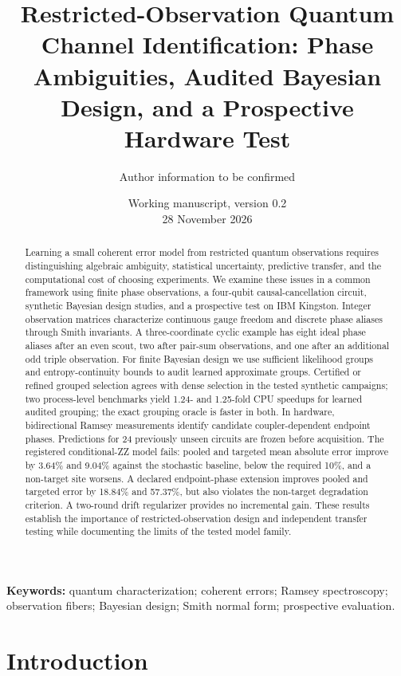 \documentclass[11pt,a4paper]{article}
\title{Restricted-Observation Quantum Channel Identification: Phase Ambiguities, Audited Bayesian Design, and a Prospective Hardware Test}
\author{Author information to be confirmed}
\date{Working manuscript, version 0.2\\28 November 2026}
\begin{document}
\maketitle


\begin{abstract}

Learning a small coherent error model from restricted quantum observations requires distinguishing algebraic ambiguity, statistical uncertainty, predictive transfer, and the computational cost of choosing experiments. We examine these issues in a common framework using finite phase observations, a four-qubit causal-cancellation circuit, synthetic Bayesian design studies, and a prospective test on IBM Kingston. Integer observation matrices characterize continuous gauge freedom and discrete phase aliases through Smith invariants. A three-coordinate cyclic example has eight ideal phase aliases after an even scout, two after pair-sum observations, and one after an additional odd triple observation. For finite Bayesian design we use sufficient likelihood groups and entropy-continuity bounds to audit learned approximate groups. Certified or refined grouped selection agrees with dense selection in the tested synthetic campaigns; two process-level benchmarks yield 1.24- and 1.25-fold CPU speedups for learned audited grouping; the exact grouping oracle is faster in both. In hardware, bidirectional Ramsey measurements identify candidate coupler-dependent endpoint phases. Predictions for 24 previously unseen circuits are frozen before acquisition. The registered conditional-ZZ model fails: pooled and targeted mean absolute error improve by 3.64\% and 9.04\% against the stochastic baseline, below the required 10\%, and a non-target site worsens. A declared endpoint-phase extension improves pooled and targeted error by 18.84\% and 57.37\%, but also violates the non-target degradation criterion. A two-round drift regularizer provides no incremental gain. These results establish the importance of restricted-observation design and independent transfer testing while documenting the limits of the tested model family.

\end{abstract}
\smallskip\noindent \textbf{Keywords:} quantum characterization; coherent errors; Ramsey spectroscopy; observation fibers; Bayesian design; Smith normal form; prospective evaluation.\par

\section{Introduction}
\end{document}
